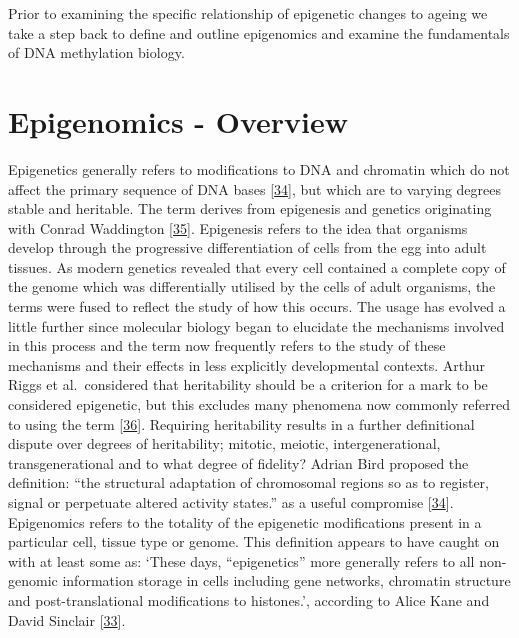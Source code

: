 \documentclass[
]{book}
\begin{document}
Prior to examining the specific relationship of epigenetic changes to ageing we take a step back to define and outline epigenomics and examine the fundamentals of DNA methylation biology.

\hypertarget{epigenomics---overview}{%
\section{Epigenomics - Overview}\label{epigenomics---overview}}

Epigenetics generally refers to modifications to DNA and chromatin which do not affect the primary sequence of DNA bases {[}\protect\hyperlink{ref-Bird2007}{34}{]}, but which are to varying degrees stable and heritable.
The term derives from epigenesis and genetics originating with Conrad Waddington {[}\protect\hyperlink{ref-Waddington1942}{35}{]}.
Epigenesis refers to the idea that organisms develop through the progressive differentiation of cells from the egg into adult tissues.
As modern genetics revealed that every cell contained a complete copy of the genome which was differentially utilised by the cells of adult organisms, the terms were fused to reflect the study of how this occurs.
The usage has evolved a little further since molecular biology began to elucidate the mechanisms involved in this process and the term now frequently refers to the study of these mechanisms and their effects in less explicitly developmental contexts.
Arthur Riggs et al.~considered that heritability should be a criterion for a mark to be considered epigenetic, but this excludes many phenomena now commonly referred to using the term {[}\protect\hyperlink{ref-Russo1996}{36}{]}.
Requiring heritability results in a further definitional dispute over degrees of heritability; mitotic, meiotic, intergenerational, transgenerational and to what degree of fidelity?
Adrian Bird proposed the definition: ``the structural adaptation of chromosomal regions so as to register, signal or perpetuate altered activity states.'' as a useful compromise {[}\protect\hyperlink{ref-Bird2007}{34}{]}.
Epigenomics refers to the totality of the epigenetic modifications present in a particular cell, tissue type or genome.
This definition appears to have caught on with at least some as: `These days, ``epigenetics'' more generally refers to all non-genomic information storage in cells including gene networks, chromatin structure and post-translational modifications to histones.', according to Alice Kane and David Sinclair {[}\protect\hyperlink{ref-Kane2019}{33}{]}.
\end{document}
